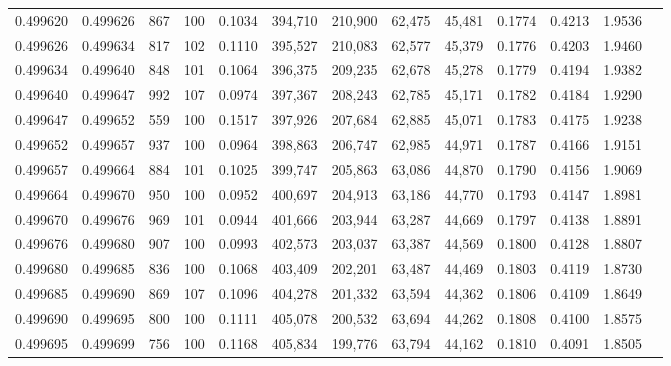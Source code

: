 \begin{tabular}{rrrrrrrrrrrrr}
0.499620 & 0.499626 &   867 & 100 &                                     0.1034 & 394,710 & 210,900 &  62,475 &  45,481 & 0.1774 & 0.4213 & 1.9536 \\
0.499626 & 0.499634 &   817 & 102 &                                     0.1110 & 395,527 & 210,083 &  62,577 &  45,379 & 0.1776 & 0.4203 & 1.9460 \\
0.499634 & 0.499640 &   848 & 101 &                                     0.1064 & 396,375 & 209,235 &  62,678 &  45,278 & 0.1779 & 0.4194 & 1.9382 \\
0.499640 & 0.499647 &   992 & 107 &                                     0.0974 & 397,367 & 208,243 &  62,785 &  45,171 & 0.1782 & 0.4184 & 1.9290 \\
0.499647 & 0.499652 &   559 & 100 &                                     0.1517 & 397,926 & 207,684 &  62,885 &  45,071 & 0.1783 & 0.4175 & 1.9238 \\
0.499652 & 0.499657 &   937 & 100 &                                     0.0964 & 398,863 & 206,747 &  62,985 &  44,971 & 0.1787 & 0.4166 & 1.9151 \\
0.499657 & 0.499664 &   884 & 101 &                                     0.1025 & 399,747 & 205,863 &  63,086 &  44,870 & 0.1790 & 0.4156 & 1.9069 \\
0.499664 & 0.499670 &   950 & 100 &                                     0.0952 & 400,697 & 204,913 &  63,186 &  44,770 & 0.1793 & 0.4147 & 1.8981 \\
0.499670 & 0.499676 &   969 & 101 &                                     0.0944 & 401,666 & 203,944 &  63,287 &  44,669 & 0.1797 & 0.4138 & 1.8891 \\
0.499676 & 0.499680 &   907 & 100 &                                     0.0993 & 402,573 & 203,037 &  63,387 &  44,569 & 0.1800 & 0.4128 & 1.8807 \\
0.499680 & 0.499685 &   836 & 100 &                                     0.1068 & 403,409 & 202,201 &  63,487 &  44,469 & 0.1803 & 0.4119 & 1.8730 \\
0.499685 & 0.499690 &   869 & 107 &                                     0.1096 & 404,278 & 201,332 &  63,594 &  44,362 & 0.1806 & 0.4109 & 1.8649 \\
0.499690 & 0.499695 &   800 & 100 &                                     0.1111 & 405,078 & 200,532 &  63,694 &  44,262 & 0.1808 & 0.4100 & 1.8575 \\
0.499695 & 0.499699 &   756 & 100 &                                     0.1168 & 405,834 & 199,776 &  63,794 &  44,162 & 0.1810 & 0.4091 & 1.8505 \\

\end{tabular}
